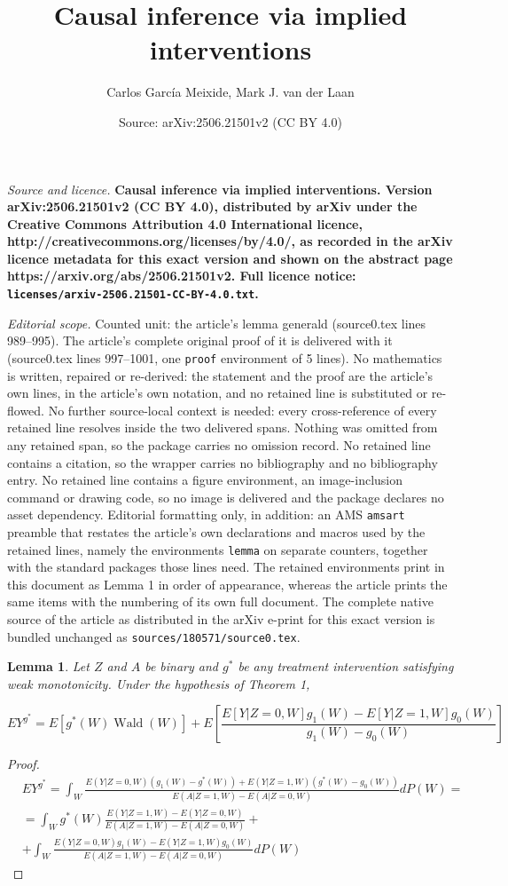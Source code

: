 \documentclass[10pt,a4paper]{amsart}
\title{\bf Causal inference via implied interventions}
\author{Carlos Garc\'ia Meixide, Mark J. van der Laan}
\date{Source: arXiv:2506.21501v2 (CC BY 4.0)}
\newtheorem{lemma}{Lemma}
\begin{document}
\maketitle

\noindent\emph{Source and licence.} \bf Causal inference via implied interventions. Version arXiv:2506.21501v2 (CC BY 4.0), distributed by arXiv under the Creative Commons Attribution 4.0 International licence, http://creativecommons.org/licenses/by/4.0/, as recorded in the arXiv licence metadata for this exact version and shown on the abstract page https://arxiv.org/abs/2506.21501v2. Full licence notice: \texttt{licenses/arxiv-2506.21501-CC-BY-4.0.txt}.\par\smallskip

\noindent\textit{Editorial scope.} Counted unit: the article's lemma generald (source0.tex lines 989--995). The article's complete original proof of it is delivered with it (source0.tex lines 997--1001, one \texttt{proof} environment of 5 lines). No mathematics is written, repaired or re-derived: the statement and the proof are the article's own lines, in the article's own notation, and no retained line is substituted or re-flowed.  No further source-local context is needed: every cross-reference of every retained line resolves inside the two delivered spans.  Nothing was omitted from any retained span, so the package carries no omission record.  No retained line contains a citation, so the wrapper carries no bibliography and no bibliography entry.  No retained line contains a figure environment, an image-inclusion command or drawing code, so no image is delivered and the package declares no asset dependency.  Editorial formatting only, in addition: an AMS \texttt{amsart} preamble that restates the article's own declarations and macros used by the retained lines, namely the environments \texttt{lemma} on separate counters, together with the standard packages those lines need.  The retained environments print in this document as Lemma 1 in order of appearance, whereas the article prints the same items with the numbering of its own full document.  The complete native source of the article as distributed in the arXiv e-print for this exact version is bundled unchanged as \texttt{sources/180571/source0.tex}.
\begin{lemma}\label{generald}
	Let $Z$ and $A$ be binary and $g^*$ be any treatment intervention satisfying weak monotonicity. Under the hypothesis of Theorem 1, 
	
	$$EY^{g^*} = E\left[ g^*(W) \operatorname{Wald}(W) \right]+ E \left[ \frac{E[Y| Z=0,W]g_1(W)- E[Y|Z=1,W]g_0(W)}{g_1(W)-g_0(W)}\right]$$
	
	
\end{lemma}

\begin{proof}
$$\begin{aligned}&EY^{g^*} = \int_W\frac{E(Y|Z=0,W)(g_1(W) - g^*(W)) + E(Y|Z=1,W)(g^*(W) - g_0(W))}{E(A |Z=1,W) - E(A |Z=0,W)} dP(W) = \\
	&= \int_Wg^*(W)\frac{E(Y|Z=1,W)- E(Y|Z=0,W)}{E(A |Z=1,W) - E(A |Z=0,W)} + \\&+ \int_W\frac{E(Y|Z=0,W)g_1(W)- E(Y|Z=1,W)g_0(W)}{E(A |Z=1,W) - E(A |Z=0,W)}
	dP(W)\end{aligned}$$
	\end{proof}
\end{document}
